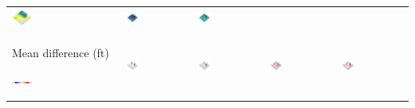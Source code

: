 \documentclass[prodmode,acmtochi]{acmsmall} %
\begin{document}
\begin{table}
{\begin{tabular}{m{} m{} m{} m{} m{}}
\includegraphics[width=0.19\textwidth]{images/render_3d/stdev_dem_1.png} &
\includegraphics[width=0.19\textwidth]{images/render_3d/stdev_dem_2.png} &
\includegraphics[width=0.19\textwidth]{images/render_3d/stdev_dem_3.png}\\
%
Mean difference (ft) \par \vspace{0.5em} \includegraphics[width=0.19\textwidth]{images/legends/diff_legend_1.pdf} & 
\includegraphics[width=0.19\textwidth]{images/render_3d/dem_difference_1.png} &
\includegraphics[width=0.19\textwidth]{images/render_3d/mean_dem_regression_difference_1.png} &
\includegraphics[width=0.19\textwidth]{images/render_3d/mean_dem_regression_difference_2.png} &
\includegraphics[width=0.19\textwidth]{images/render_3d/mean_dem_regression_difference_3.png}\\

\end{tabular}}
\end{table}
\end{document}
